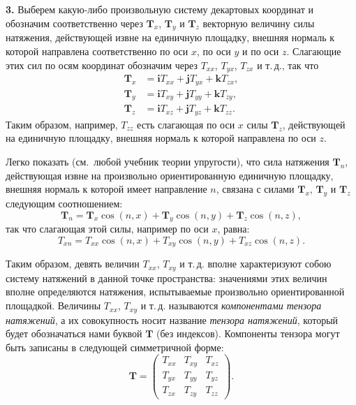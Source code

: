 \documentclass[a4paper,12pt]{article}
\begin{document}
\textbf{3.} Выберем какую-либо произвольную систему декартовых координат
и обозначим соответственно через $\mathbf{T}_x$, $\mathbf{T}_y$ и
$\mathbf{T}_z$ векторную величину силы натяжения, действующей извне на
единичную площадку, внешняя нормаль к которой направлена соответственно
по оси $x$, по оси $y$ и по оси $z$. Слагающие этих сил по осям
координат обозначим через $T_{xx}$, $T_{yx}$, $T_{zx}$ и т.\,д., так
что
\begin{align*}
    \mathbf{T}_x &= \mathbf{i}T_{xx} + \mathbf{j}T_{yx} + \mathbf{k}T_{zx}, \\
    \mathbf{T}_y &= \mathbf{i}T_{xy} + \mathbf{j}T_{yy} + \mathbf{k}T_{zy}, \\
    \mathbf{T}_z &= \mathbf{i}T_{xz} + \mathbf{j}T_{yz} + \mathbf{k}T_{zz}.
\end{align*}
Таким образом, например, $T_{zz}$ есть слагающая по оси $x$ силы
$\mathbf{T}_z$, действующей на единичную площадку, внешняя нормаль
к которой направлена по оси $z$.


Легко показать (см.\ любой учебник теории упругости), что сила
натяжения $\mathbf{T}_n$, действующая извне на произвольно
ориентированную единичную площадку, внешняя нормаль к которой имеет
направление $n$, связана с силами $\mathbf{T}_x$, $\mathbf{T}_y$
и $\mathbf{T}_z$ следующим соотношением:
\begin{equation}
    \mathbf{T}_n = \mathbf{T}_x\cos(n,x) + \mathbf{T}_y\cos(n,y)
                 + \mathbf{T}_z\cos(n,z),
    \tag{33.4}
\end{equation}
так что слагающая этой силы, например по оси $x$, равна:
\begin{equation}
    T_{xn} = T_{xx}\cos(n,x) + T_{xy}\cos(n,y) + T_{xz}\cos(n,z).
    \tag{33.5}
\end{equation}

Таким образом, девять величин $T_{xx}$, $T_{xy}$ и т.\,д. вполне
характеризуют собою систему натяжений в данной точке пространства:
значениями этих величин вполне определяются натяжения, испытываемые
произвольно ориентированной площадкой. Величины $T_{xx}$, $T_{xy}$
и т.\,д. называются \textit{компонентами тензора натяжений}, а их
совокупность носит название \textit{тензора натяжений}, который будет
обозначаться нами буквой $\mathbf{T}$ (без индексов). Компоненты
тензора могут быть записаны в следующей симметричной форме:
\begin{equation}
    \mathbf{T} =
    \begin{pmatrix}
        T_{xx} & T_{xy} & T_{xz} \\
        T_{yx} & T_{yy} & T_{yz} \\
        T_{zx} & T_{zy} & T_{zz}
    \end{pmatrix}.
    \tag{33.6}
\end{equation}
\end{document}

